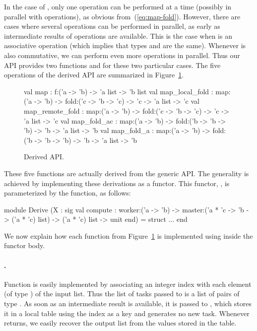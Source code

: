 \documentclass[a4paper,12pt]{article}
\begin{document}
In the case of , only one  operation can
be performed at a time (possibly in parallel with 
operations), as obvious from~(\ref{eq:map-fold}). However, there are
cases where several  operations can be performed in parallel,
as early as intermediate results of  operations are available.
This is the case when  is an associative operation (which
implies that types  and  are the same).
Whenever
 is also commutative, we can perform even more 
operations in parallel. Thus our API provides two functions
 and  for these two particular cases.
The five operations of the derived API are summarized
in Figure~\ref{fig:derived}.
\begin{figure}[t]
  \begin{ocaml}
    val map : 
      f:('a -> 'b) -> 'a list -> 'b list 
    val map_local_fold : 
      map:('a -> 'b) -> fold:('c -> 'b -> 'c) -> 
      'c -> 'a list -> 'c 
    val map_remote_fold : 
      map:('a -> 'b) -> fold:('c -> 'b -> 'c) -> 
      'c -> 'a list -> 'c 
    val map_fold_ac : 
      map:('a -> 'b) -> fold:('b -> 'b -> 'b) -> 
      'b -> 'a list -> 'b 
    val map_fold_a : 
      map:('a -> 'b) -> fold:('b -> 'b -> 'b) -> 
      'b -> 'a list -> 'b
  \end{ocaml}
  \caption{Derived API.}
\label{fig:derived}
\end{figure}

These five functions are actually derived from the generic API.  The
generality is achieved by implementing these derivations as a functor.
This functor, , is parameterized by the 
function, as follows:
\begin{ocaml}
module Derive
  (X : sig
     val compute : 
       worker:('a -> 'b) -> master:('a * 'c -> 'b -> ('a * 'c) list) ->
       ('a * 'c) list -> unit
   end) = struct ... end
\end{ocaml}
We now explain how each function from Figure~\ref{fig:derived} is
implemented using  inside the functor body.

\paragraph{.} 
Function  is easily implemented by associating an integer
index with each element (of type ) of the input list. Thus the
list of tasks passed to  is a list of pairs of type .
As soon as an intermediate result is available, it is passed to
, which stores it in a local table using the index as a key
and generates no new task. Whenever  returns, we easily
recover the output list from the values stored in the table.
\end{document}
